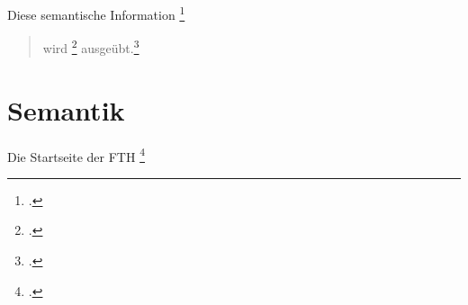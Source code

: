 \documentclass[a4paper,12pt]{scrreprt}
\newcommand{\captheb}[1]{\textrm{\texthebrew{#1}}}
\begin{document}
Diese semantische Information \footcite[nach (Zeitschrift-)Artikel][8-12]{Williamson2009}

\begin{quote}
wird \footcite[nach Lexika][8-12]{Khan2013} ausgeübt.\footcite[nach Sammelband][8-12]{Fillmore1968}
\end{quote}
\section{\label{Semantik}Semantik}

Die Startseite der FTH \footcite{FTHStartseite2019}

%
%
%
%


\sloppy %

\printbibliography [heading=bibintoc]
\label{Literatur}

\end{document}
